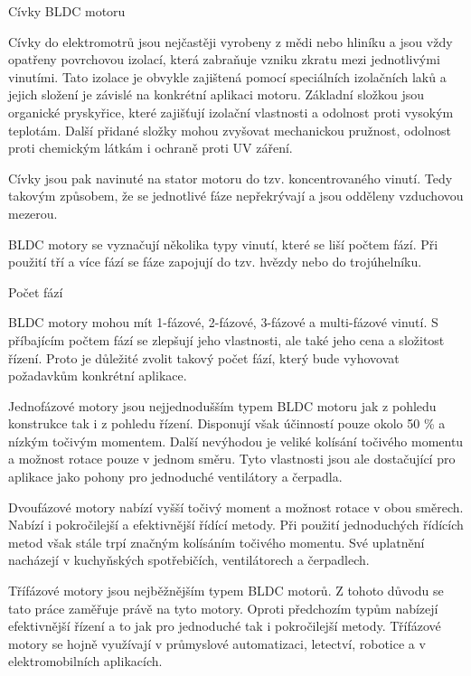 
 \sec Cívky BLDC motoru

 Cívky do elektromotrů jsou nejčastěji vyrobeny z mědi nebo hliníku a jsou vždy opatřeny povrchovou izolací, 
 která zabraňuje vzniku zkratu mezi jednotlivými vinutími.
 Tato izolace je obvykle zajištená pomocí speciálních izolačních laků a jejich složení je závislé na konkrétní aplikaci motoru.
 Základní složkou jsou organické pryskyřice, které zajišťují izolační vlastnosti a odolnost proti vysokým teplotám. Další přidané složky
 mohou zvyšovat mechanickou pružnost, odolnost proti chemickým látkám i ochraně proti UV záření. %

Cívky jsou pak navinuté na stator motoru do tzv. koncentrovaného vinutí. 
Tedy takovým způsobem, že se jednotlivé fáze nepřekrývají a jsou odděleny vzduchovou mezerou.

BLDC motory se vyznačují několika typy vinutí, které se liší počtem fází. Při použití tří a více fází 
se fáze zapojují do tzv. hvězdy nebo do trojúhelníku. 

\secc Počet fází

BLDC motory mohou mít 1-fázové, 2-fázové, 3-fázové a multi-fázové vinutí.
S příbajícím počtem fází se zlepšují jeho vlastnosti, ale také jeho cena a složitost řízení. 
Proto je důležité zvolit takový počet fází, který bude vyhovovat požadavkům konkrétní aplikace.

Jednofázové motory jsou nejjednodušším typem BLDC motoru jak z pohledu konstrukce tak i z pohledu řízení. 
Disponují však účinností pouze okolo 50 \% a nízkým točivým momentem.
 Další nevýhodou je veliké kolísání točivého momentu a možnost rotace pouze v jednom směru.
 Tyto vlastnosti jsou ale dostačující pro aplikace jako pohony pro jednoduché ventilátory a čerpadla.

Dvoufázové motory nabízí vyšší točivý moment a možnost rotace v obou směrech.
Nabízí i pokročilejší a efektivnější řídící metody.
Při použití jednoduchých řídících metod však stále trpí značným kolísáním točivého momentu.
Své uplatnění nacházejí v kuchyňských spotřebičích, ventilátorech a čerpadlech. 


Třífázové motory jsou nejběžnějším typem BLDC motorů. Z tohoto důvodu se tato práce zaměřuje právě na tyto motory.
Oproti předchozím typům nabízejí efektivnější řízení a to jak pro jednoduché tak i pokročilejší metody.
Třífázové motory se hojně využívají v průmyslové automatizaci, letectví, robotice a v elektromobilních aplikacích. 

